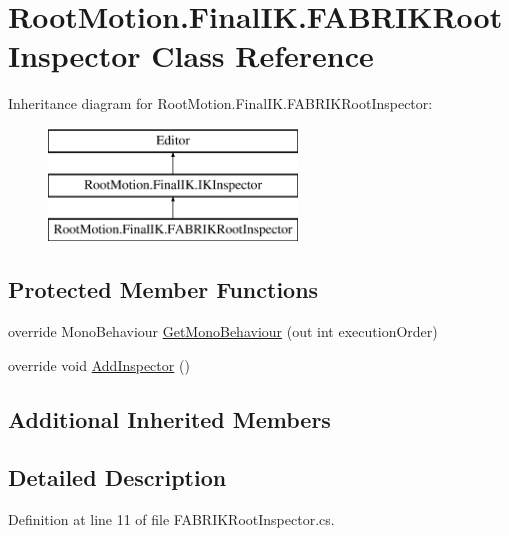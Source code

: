 \hypertarget{class_root_motion_1_1_final_i_k_1_1_f_a_b_r_i_k_root_inspector}{}\section{Root\+Motion.\+Final\+I\+K.\+F\+A\+B\+R\+I\+K\+Root\+Inspector Class Reference}
\label{class_root_motion_1_1_final_i_k_1_1_f_a_b_r_i_k_root_inspector}
Inheritance diagram for Root\+Motion.\+Final\+I\+K.\+F\+A\+B\+R\+I\+K\+Root\+Inspector\+:\begin{figure}[H]
\begin{center}
\leavevmode
\includegraphics[height=3.000000cm]{class_root_motion_1_1_final_i_k_1_1_f_a_b_r_i_k_root_inspector}
\end{center}
\end{figure}
\subsection*{Protected Member Functions}
\begin{DoxyCompactItemize}
\item 
override Mono\+Behaviour \mbox{\hyperlink{class_root_motion_1_1_final_i_k_1_1_f_a_b_r_i_k_root_inspector_adbfccfa739bbac889779f0f728913138}{Get\+Mono\+Behaviour}} (out int execution\+Order)
\item 
override void \mbox{\hyperlink{class_root_motion_1_1_final_i_k_1_1_f_a_b_r_i_k_root_inspector_ac2cb8badb18c83369ddf9bffef415a68}{Add\+Inspector}} ()
\end{DoxyCompactItemize}
\subsection*{Additional Inherited Members}


\subsection{Detailed Description}


Definition at line 11 of file F\+A\+B\+R\+I\+K\+Root\+Inspector.\+cs.



